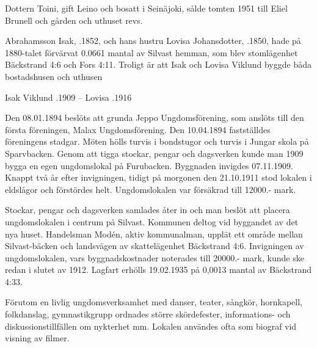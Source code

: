 Dottern Toini, gift Leino och bosatt i Seinäjoki, sålde tomten 1951 till Eliel Brunell och gården och uthuset revs.

 Abrahamsson Isak, .1852, och hans hustru Lovisa Johansdotter, .1850, hade på 1880-talet förvärvat 0.0661 mantal av Silvast hemman, som blev stomlägenhet Bäckstrand 4:6 och Fors 4:11. Troligt är att Isak och Lovisa Viklund byggde båda bostadshusen och uthusen
\begin{jhchildren}
  \item {}
  \item {}
  \item {}
\end{jhchildren}

Isak Viklund .1909  --  Lovisa .1916





Den 08.01.1894 beslöts att grunda Jeppo Ungdomsförening, som anslöts till den första föreningen, Malax Ungdomsförening. Den 10.04.1894 fastställdes föreningens stadgar. Möten hölls turvis i bondstugor och turvis i Jungar skola på Sparvbacken. Genom att tigga stockar, pengar och dagsverken kunde man 1909 bygga en egen ungdomslokal på Furubacken.  Byggnaden invigdes 07.11.1909. Knappt två år efter invigningen, tidigt på morgonen den 21.10.1911 stod lokalen i eldslågor och förstördes helt. Ungdomslokalen var försäkrad till 12000.- mark.


Stockar, pengar och dagsverken samlades åter in och man beslöt att placera ungdomslokalen i centrum på Silvast. Kommunen deltog vid byggandet av det nya huset. Handelsman Modén, aktiv kommunalman, upplät ett område mellan Silvast-bäcken och landsvägen av skattelägenhet Bäckstrand 4:6. Invigningen av ungdomslokalen, vars byggnadskostnader noterades till 20000.- mark, kunde ske redan i slutet av 1912. Lagfart erhölls 19.02.1935 på 0,0013 mantal av Bäckstrand 4:33.

Förutom en livlig ungdomsverksamhet med danser, teater, sångkör, hornkapell, folkdanslag, gymnastikgrupp ordnades större skördefester, informations- och diskussionstillfällen om nykterhet mm. Lokalen användes ofta som biograf vid visning av filmer.

